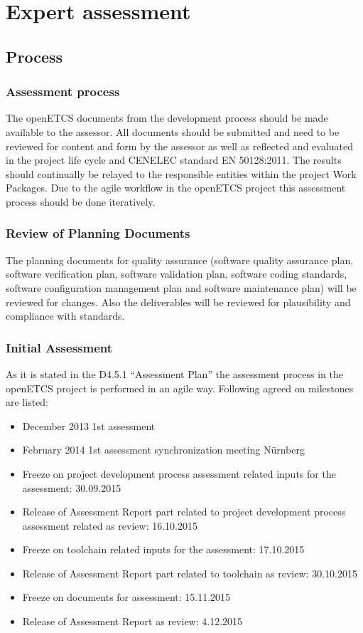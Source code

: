 \section{Expert assessment}

\subsection{Process }\label{sec:process-}
\subsubsection{Assessment process}

\bigskip
The openETCS documents from the development process should be made available to the assessor. All documents should be submitted and need to be reviewed for content and form by the assessor as well as reflected and evaluated in the project life cycle and CENELEC standard EN 50128:2011. The results should continually be relayed to the responsible entities within the project Work Packages. Due to the agile workflow in the openETCS project this assessment process should be done iteratively.
\bigskip

\subsubsection{Review of Planning Documents}
The planning documents for quality assurance (software quality assurance plan, software verification plan, software validation plan, software coding standards, software configuration management plan and software maintenance plan) will be reviewed for changes. Also the deliverables will be reviewed for plausibility and compliance with standards.
\bigskip


\bigskip
\subsubsection{Initial Assessment }

As it is stated in the D4.5.1 “Assessment Plan” the assessment process in the openETCS project is performed in an agile way. Following agreed on milestones are listed:

\begin{itemize}	
\item  December 2013 1st assessment
\item  February 2014 1st assessment synchronization meeting Nürnberg
\item  Freeze on project development process assessment related inputs for the assessment: 30.09.2015
\item  Release of Assessment Report part related to project development process assessment related as review: 16.10.2015
\item Freeze on toolchain related inputs for the assessment: 17.10.2015
\item  Release of Assessment Report part related to toolchain as review: 30.10.2015
\item Freeze on documents for assessment: 15.11.2015
\item  Release of Assessment Report as review: 4.12.2015
\end{itemize}


